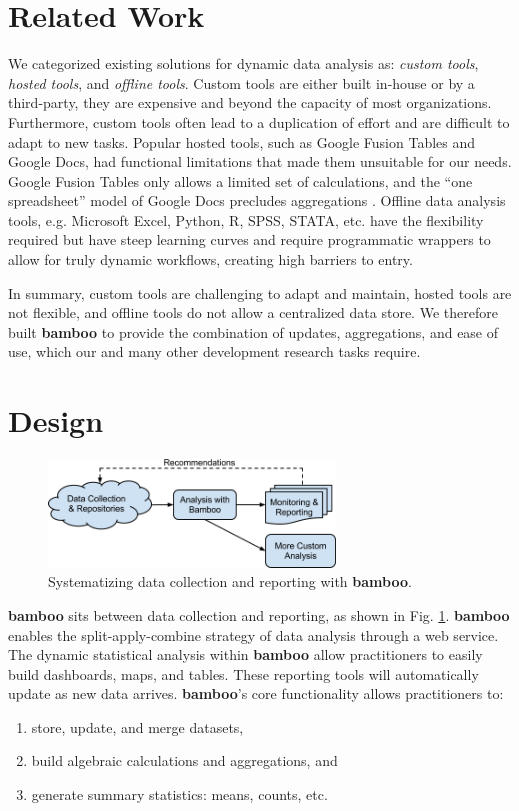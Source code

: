 \documentclass{sig-alternate}
\begin{document}
\vspace{1px}
\section{Related Work}
We categorized existing solutions for dynamic data
analysis as: \emph{custom tools}, \emph{hosted tools}, and \emph{offline tools}.  Custom tools are
either built in-house or by a third-party, they are expensive and beyond the
capacity of most organizations. Furthermore, custom tools often lead to
a duplication of effort and are difficult to adapt to new tasks.  Popular hosted
tools, such as Google Fusion Tables and Google Docs, had functional limitations
that made them unsuitable for our needs.  Google Fusion Tables only allows a limited set of
calculations, and the ``one spreadsheet'' model of Google Docs precludes
aggregations \cite{gonzalez2}.  Offline data analysis tools, e.g. Microsoft Excel, Python, R, SPSS, STATA, etc. have the flexibility required but have steep learning curves and require programmatic wrappers to allow for truly dynamic workflows, creating high barriers to entry.

In summary, custom tools are challenging to adapt and maintain, hosted tools are
not flexible, and offline tools do not allow a centralized data store.
We therefore built \textbf{bamboo} to provide the combination of
updates, aggregations, and ease of use, which our and many other development research tasks
require.

\section{Design}

\begin{figure}
\centering
\includegraphics[width=3in]{figures/bamboo_flow}
\caption{Systematizing data collection and reporting with \textbf{bamboo}.}
\label{fig:flow}
\end{figure}

\textbf{bamboo} sits between data collection and reporting, as shown in Fig.
\ref{fig:flow}. \textbf{bamboo}
enables the split-apply-combine strategy of data analysis
\cite{wickham} through a web service.
The dynamic statistical analysis within \textbf{bamboo} allow practitioners to easily build
dashboards, maps, and tables.  These reporting tools will automatically update as new data
arrives.    
\textbf{bamboo}'s core functionality allows
practitioners to:
\begin{enumerate}
\item store, update, and merge datasets,
\vspace{-1px}
\item build algebraic calculations and aggregations, and
\vspace{-1px}
\item generate summary statistics: means, counts, etc.
\end{enumerate}
\end{document}
